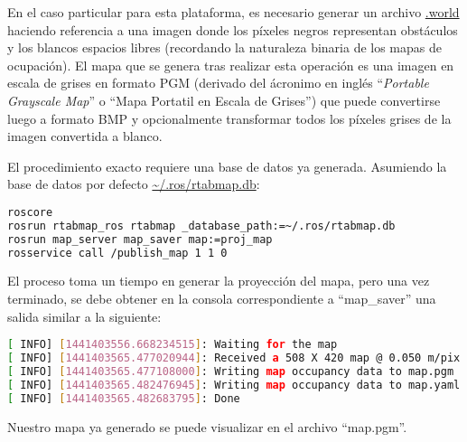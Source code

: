 En el caso particular para esta plataforma, es necesario generar un archivo \url{.world} haciendo referencia a una imagen donde los píxeles negros representan obstáculos y los blancos espacios libres (recordando la naturaleza binaria de los mapas de ocupación). El mapa que se genera tras realizar esta operación es una imagen en escala de grises en formato PGM \cite{pgmformat} (derivado del ácronimo en inglés ``\textit{Portable Grayscale Map}'' o ``Mapa Portatil en Escala de Grises'') que puede convertirse luego a formato BMP y opcionalmente transformar todos los píxeles grises de la imagen convertida a blanco.

El procedimiento exacto requiere una base de datos ya generada. Asumiendo la base de datos por defecto \url{~/.ros/rtabmap.db}:

\begin{blackcodebox}
\begin{lstlisting}[language=bash]
roscore
rosrun rtabmap_ros rtabmap _database_path:=~/.ros/rtabmap.db
rosrun map_server map_saver map:=proj_map
rosservice call /publish_map 1 1 0
\end{lstlisting}
\end{blackcodebox}

El proceso toma un tiempo en generar la proyección del mapa, pero una vez terminado, se debe obtener en la consola correspondiente a ``map\_saver'' una salida similar a la siguiente:

\begin{blackcodebox}
\begin{lstlisting}[language=bash]
[ INFO] [1441403556.668234515]: Waiting for the map
[ INFO] [1441403565.477020944]: Received a 508 X 420 map @ 0.050 m/pix
[ INFO] [1441403565.477108000]: Writing map occupancy data to map.pgm
[ INFO] [1441403565.482476945]: Writing map occupancy data to map.yaml
[ INFO] [1441403565.482683795]: Done
\end{lstlisting}
\end{blackcodebox}

Nuestro mapa ya generado se puede visualizar en el archivo ``map.pgm''.